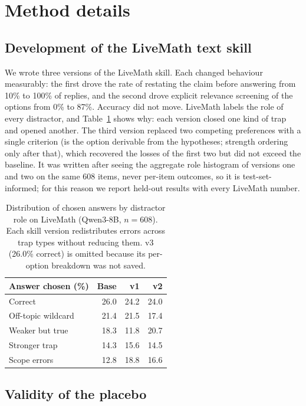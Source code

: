 \documentclass[11pt]{article}
\begin{document}
\section{Method details}
\label{app:method}

\subsection{Development of the LiveMath text skill}
\label{app:livemathskill}

We wrote three versions of the LiveMath skill. Each changed behaviour measurably: the first drove
the rate of restating the claim before answering from 10\% to 100\% of replies, and the second drove
explicit relevance screening of the options from 0\% to 87\%. Accuracy did not move. LiveMath labels
the role of every distractor, and Table~\ref{tab:roles} shows why: each version closed one kind of
trap and opened another. The third version replaced two competing preferences with a single
criterion (is the option derivable from the hypotheses; strength ordering only after that), which
recovered the losses of the first two but did not exceed the baseline. It was written after seeing
the aggregate role histogram of versions one and two on the same 608 items, never per-item outcomes,
so it is test-set-informed; for this reason we report held-out results with every LiveMath number.

\begin{table}[t]
\centering\small
\begin{tabular}{@{}lrrr@{}}
\toprule
Answer chosen (\%) & Base & v1 & v2 \\
\midrule
Correct & 26.0 & 24.2 & 24.0 \\
Off-topic wildcard & 21.4 & 21.5 & 17.4 \\
Weaker but true & 18.3 & 11.8 & 20.7 \\
Stronger trap & 14.3 & 15.6 & 14.5 \\
Scope errors & 12.8 & 18.8 & 16.6 \\
\bottomrule
\end{tabular}
\caption{Distribution of chosen answers by distractor role on LiveMath (Qwen3-8B, $n=608$). Each
skill version redistributes errors across trap types without reducing them. v3 (26.0\% correct) is
omitted because its per-option breakdown was not saved.}
\label{tab:roles}
\end{table}

\subsection{Validity of the placebo}
\label{app:placebo}
\end{document}
